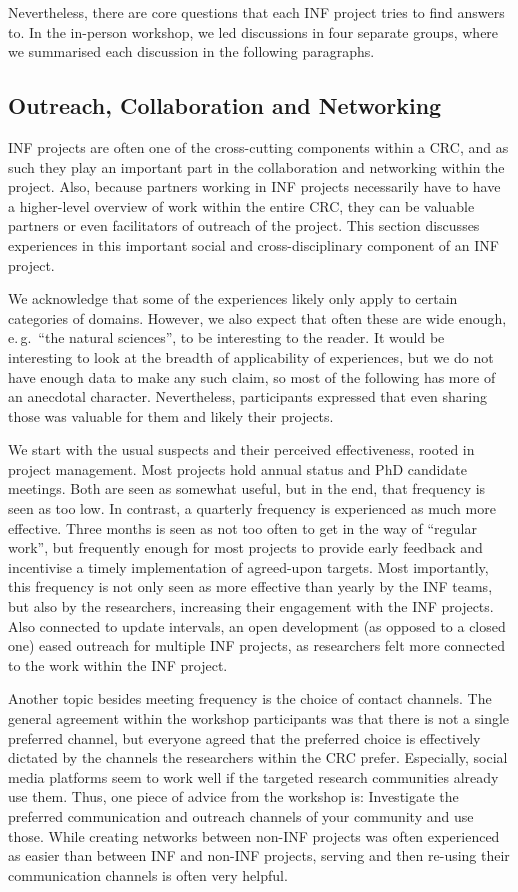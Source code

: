 \documentclass{eceasst}
\newcommand{\eg}{e.\,g.}
\begin{document}
Nevertheless, there are core questions that each INF project tries to find answers to.
In the in-person workshop, we led discussions in four separate groups, where we summarised each discussion
in the following paragraphs.

\subsection{Outreach, Collaboration and Networking}
INF projects are often one of the cross-cutting components within a CRC,
and as such they play an important part in the collaboration and networking within the project.
Also, because partners working in INF projects necessarily have to have a higher-level overview of work within the entire CRC,
they can be valuable partners or even facilitators of outreach of the project.
This section discusses experiences in this important social and cross-disciplinary component of an INF project.

We acknowledge that some of the experiences likely only apply to certain categories of domains.
However, we also expect that often these are wide enough, \eg~“the natural sciences”, to be interesting to the reader.
It would be interesting to look at the breadth of applicability of experiences,
but we do not have enough data to make any such claim, so most of the following has more of an anecdotal character.
Nevertheless, participants expressed that even sharing those was valuable for them and likely their projects.

We start with the usual suspects and their perceived effectiveness, rooted in project management.
Most projects hold annual status and PhD candidate meetings.
Both are seen as somewhat useful, but in the end, that frequency is seen as too low.
In contrast, a quarterly frequency is experienced as much more effective.
Three months is seen as not too often to get in the way of “regular work”,
but frequently enough for most projects to provide early feedback and incentivise a timely implementation of agreed-upon targets.
Most importantly, this frequency is not only seen as more effective than yearly by the INF teams,
but also by the researchers, increasing their engagement with the INF projects.
Also connected to update intervals, an open development (as opposed to a closed one) eased outreach for multiple INF projects,
as researchers felt more connected to the work within the INF project.

Another topic besides meeting frequency is the choice of contact channels.
The general agreement within the workshop participants was that there is not a single preferred channel,
but everyone agreed that the preferred choice is effectively dictated by the channels the researchers within the CRC prefer.
Especially, social media platforms seem to work well if the targeted research communities already use them.
Thus, one piece of advice from the workshop is: Investigate the preferred communication and outreach channels of your community and use those.
While creating networks between non-INF projects was often experienced as easier than between INF and non-INF projects,
serving and then re-using their communication channels is often very helpful.
\end{document}
